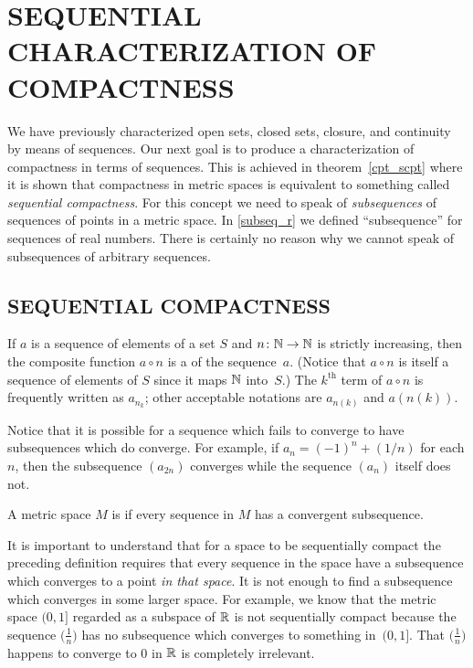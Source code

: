 \chapter{SEQUENTIAL CHARACTERIZATION OF COMPACTNESS}

We have previously characterized open sets, closed sets, closure, and continuity by means of
sequences.  Our next goal is to produce a characterization of compactness in terms of
sequences.  This is achieved in theorem~\ref{cpt_scpt} where it is shown that compactness in
metric spaces is equivalent to something called \emph{sequential compactness}.  For this
concept we need to speak of \emph{subsequences} of sequences of points in a metric space. In
\ref{subseq_r} we defined ``subsequence'' for sequences of real numbers.  There is certainly
no reason why we cannot speak of subsequences of arbitrary sequences.



\section{SEQUENTIAL COMPACTNESS}
\begin{defn} If $a$ is a sequence of elements of a set $S$ and $n \colon \mathbb{N} \rightarrow \mathbb{N}$ is
strictly increasing, then the composite function $a \circ n$ is a
 of the sequence~$a$. (Notice that $a \circ n$ is itself a sequence of
elements of $S$ since it maps $\mathbb{N}$ into~$S$.) The $k^{\text{th}}$ term of $a \circ n$ is
frequently written as $a_{n_k}$; other acceptable notations are $a_{n(k)}$ and $a(n(k))$.
\end{defn}

Notice that it is possible for a sequence which fails to converge to have subsequences which
do converge.  For example, if $a_n = (-1)^n + (1/n)$ for each $n$, then the subsequence
$(a_{2n})$ converges while the sequence $(a_n)$ itself does not.

\begin{defn} A metric space $M$ is
 if every sequence in $M$ has a convergent subsequence.
\end{defn}

\begin{exam} It is important to understand that for a space to be sequentially compact the
preceding definition requires that every sequence in the space have a subsequence which
converges to a point \emph{in that space}.  It is not enough to find a subsequence which
converges in some larger space. For example, we know that the metric space $(0,1]$ regarded as
a subspace of $\mathbb{R}$ is not sequentially compact because the sequence $\bigl(\frac1n \bigr)$ has
no subsequence which converges to something in~$(0,1]$.  That $\bigl(\frac1n \bigr)$ happens
to converge to $0$ in $\mathbb{R}$ is completely irrelevant.
\end{exam}

